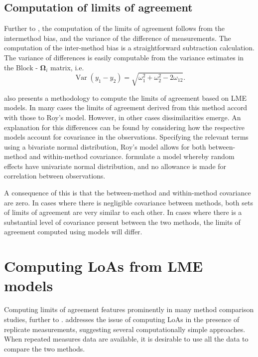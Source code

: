 \documentclass[12pt, a4paper]{report}
\theoremstyle{plain}
\theoremstyle{definition}
\theoremstyle{remark}
\begin{document}
\subsection{Computation of limits of agreement }


Further to \citet{BA86}, the computation of the limits of agreement follows from the intermethod bias, and the variance of the difference of measurements. The computation of the inter-method bias is a straightforward subtraction calculation. The variance of differences is easily computable from the variance estimates in the ${\mbox{Block - }\boldsymbol \Omega_{i}}$ matrix, i.e.
\[
\operatorname{Var}(y_1 - y_2) = \sqrt{ \omega^2_1 + \omega^2_2 - 2\omega_{12}}.
\]

\citet{BXC2008} also presents a methodology to compute the limits of agreement based on LME models. In many cases the limits of agreement derived from this method accord with those to Roy's model. However, in other cases dissimilarities emerge. An explanation for this differences can be found by considering how the respective models account for covariance in the observations. Specifying the relevant terms using a bivariate normal distribution, Roy's model allows for both between-method and within-method covariance. \citet{BXC2008} formulate a model whereby random effects have univariate normal distribution, and no allowance is made for correlation between observations.

A consequence of this is that the between-method and within-method covariance are zero. In cases where there is negligible covariance between methods, both sets of limits of agreement are very similar to each other. In cases where there is a substantial level of covariance present between the two methods, the limits of agreement computed using models will differ.

			\section{Computing LoAs from LME models}
			
			Computing limits of agreement features prominently in many method comparison studies, further to \citet{BA86,BA99}.
			\citet{BA99} addresses the issue of computing LoAs in the presence of replicate measurements, suggesting several computationally simple approaches. When repeated measures data are available, it is desirable to use
			all the data to compare the two methods.
			
\end{document}
